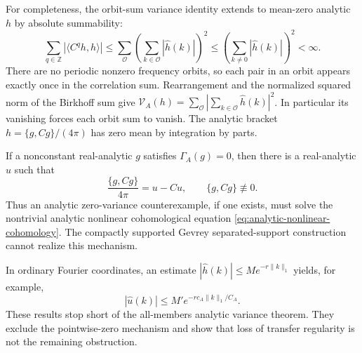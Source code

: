 For completeness, the orbit-sum variance identity extends to mean-zero
analytic $h$ by absolute summability:
\[
 \sum_{q\in\mathbb Z}|\langle C^qh,h\rangle|
 \le\sum_{\mathcal O}\left(\sum_{k\in\mathcal O}|\widehat h(k)|\right)^2
 \le\left(\sum_{k\ne0}|\widehat h(k)|\right)^2<\infty.
\]
There are no periodic nonzero frequency orbits, so each pair in an orbit
appears exactly once in the correlation sum.  Rearrangement and the normalized
squared norm of the Birkhoff sum give
$\mathcal V_A(h)=\sum_{\mathcal O}|\sum_{k\in\mathcal O}\widehat h(k)|^2$.
In particular its vanishing forces each orbit sum to vanish.  The analytic
bracket $h=\{g,Cg\}/(4\pi)$ has zero mean by integration by parts.

\begin{corollary}
\label{cor:analytic-resonance-frontier}
If a nonconstant real-analytic $g$ satisfies $\Gamma_A(g)=0$, then there is a
real-analytic $u$ such that
\begin{equation}\label{eq:analytic-nonlinear-cohomology}
 \frac{\{g,Cg\}}{4\pi}=u-Cu,
 \qquad \{g,Cg\}\not\equiv0.
\end{equation}
Thus an analytic zero-variance counterexample, if one exists, must solve the
nontrivial analytic nonlinear cohomological equation
\eqref{eq:analytic-nonlinear-cohomology}.  The compactly supported
Gevrey separated-support construction cannot realize this mechanism.
\end{corollary}

In ordinary Fourier coordinates, an estimate
$|\widehat h(k)|\le M e^{-r\|k\|_1}$ yields, for example,
\[
 |\widehat u(k)|\le M'
 e^{-r c_A\|k\|_1/C_A}.
\]
These results stop short of the all-members analytic variance theorem. They
exclude the pointwise-zero mechanism and show that loss of transfer regularity
is not the remaining obstruction.
